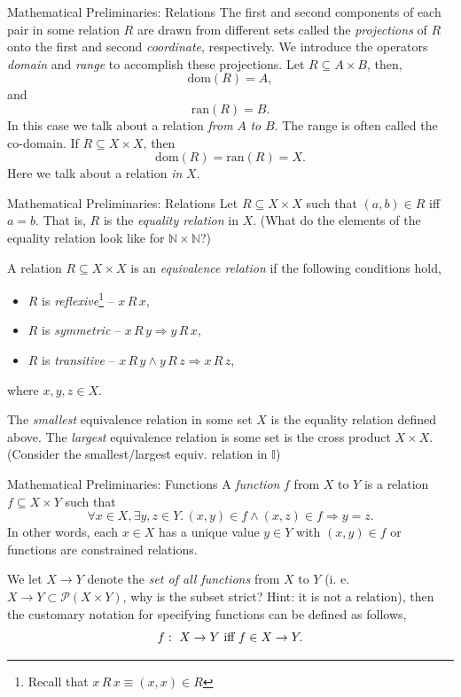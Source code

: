 \documentclass{beamer}
\begin{document}
\begin{frame}{\large Mathematical  Preliminaries: Relations}
The first and second components of each pair in some relation $R$ are drawn from different sets called
the {\em projections} of $R$ onto the first and second {\em coordinate}, respectively.  We introduce
the operators {\em domain} and {\em range} to accomplish these projections.  Let $R\subseteq A\times B$,
then,
\[
\mbox{dom}(R) = A,
\]
and
\[
\mbox{ran}(R) = B.
\]
In this case we talk about a relation {\em from} $A$ {\em to} $B$.  The range is often
called the co-domain. If $R\subseteq X\times X$, then
\[
\mbox{dom}(R) = \mbox{ran}(R) = X.
\]
Here we talk about a relation {\em in} $X$.
\end{frame}

\begin{frame}{\large Mathematical  Preliminaries: Relations}
Let $R \subseteq X\times X$ such that $(a,b)\in R$ iff $a=b$.  That is, $R$ is the {\em equality relation}
in  $X$. (What do the elements of the equality relation look like for $\mathbb{N}\times\mathbb{N}$?)

\vspace{.1in}

A relation $R\subseteq X\times X$ is an {\em equivalence relation} if the following conditions hold,
\begin{itemize}
\item $R$ is {\em reflexive}\footnote{Recall that $x\, R\, x \equiv (x,x)\in R$} -- $x\, R\, x$,
\item $R$ is {\em symmetric} -- $x\, R\, y \Rightarrow y\, R\, x$,
\item $R$ is {\em transitive} -- $x\, R\, y \wedge y\, R\, z \Rightarrow x\, R\, z$,
\end{itemize}
where $x,y,z \in X$.

\vspace{.1in}

The {\em smallest} equivalence relation in some set $X$ is the equality relation defined above.
The {\em largest} equivalence relation is some set is the cross product $X\times X$. (Consider the
smallest/largest equiv. relation in $\mathbb I$)
\end{frame}

\begin{frame}{\large Mathematical  Preliminaries: Functions}
A {\em function} $f$ from $X$ to $Y$ is a relation $f \subseteq X\times Y$ such that
\[
\forall x\in X, \exists y,z\in Y.\, (x,y)\in f \wedge (x,z)\in f \Rightarrow y = z.
\]
In other words, each $x\in X$ has a unique value $y\in Y$ with $(x,y)\in f$ or functions are constrained relations.

\vspace{.1in}

We let $X \rightarrow Y$ denote the {\em set of all functions} from $X$ to $Y$
(i. e. $X \rightarrow Y \subset {\mathcal P}(X\times Y)$, why is the subset strict? Hint: it is not a relation), then the customary notation
for specifying functions can be defined as follows,
\[
f\,\colon\; X \rightarrow Y \mbox{ iff } f\in X\rightarrow Y.
\]
\end{frame}
\end{document}
